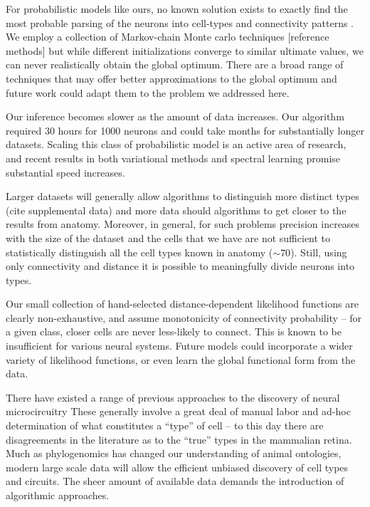 \documentclass{article}
\begin{document}
For probabilistic models like ours, no known solution exists to
exactly find the most probable parsing of the neurons into cell-types
and connectivity patterns . We employ a collection of Markov-chain
Monte carlo techniques [reference methods] but while different
initializations converge to similar ultimate values, we can never
realistically obtain the global optimum. There are a broad range of
techniques that may offer better approximations to the global optimum
\autocite{Wanga2012,FritzJonathan} and future work could adapt them to
the problem we addressed here.

Our inference becomes slower as the amount of data increases. Our
algorithm required 30 hours for 1000 neurons and could take months for
substantially longer datasets. Scaling this class of probabilistic
model is an active area of research, and recent results in both
variational methods \autocite{Hoffman2013} and spectral learning
  \autocite{Anandkumar2012} promise substantial speed increases.


  Larger datasets will generally allow algorithms to distinguish more
  distinct types (cite supplemental data) and more data should
  algorithms to get closer to the results from anatomy. Moreover, in
  general, for such problems precision increases with the size of the
  dataset and the cells that we have are not sufficient to
  statistically distinguish all the cell types known in anatomy
  ($\sim 70$). Still, using only connectivity and distance it is possible
  to meaningfully divide neurons into types.

Our small collection of hand-selected distance-dependent likelihood
functions are clearly non-exhaustive, and assume monotonicity
of connectivity probability -- for a given class, closer cells
are never less-likely to connect. This is known to be insufficient
for various neural systems. Future models could incorporate
a wider variety of likelihood functions, or even learn the global
functional form from the data. 

There have existed a range of previous approaches to the discovery
of neural microcircuitry \autocite{} These generally involve a great deal
of manual labor and ad-hoc determination of what constitutes a “type”
of cell -- to this day there are disagreements in the literature as to
the “true” types in the mammalian retina. Much as phylogenomics has
changed our understanding of animal ontologies, modern large scale
data will allow the efficient unbiased discovery of cell types and
circuits. The sheer amount of available data demands the introduction
of algorithmic approaches.
\end{document}
